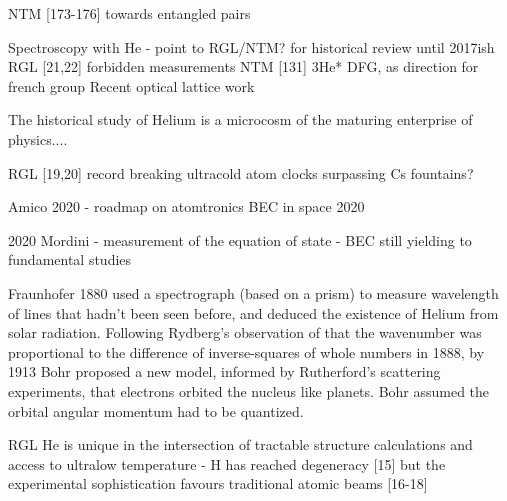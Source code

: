 		NTM [173-176] towards entangled pairs 
			
		Spectroscopy with He - point to RGL/NTM? for historical review until 2017ish
			RGL [21,22] forbidden measurements  
		NTM [131] 3He* DFG, as direction for french group 
		Recent optical lattice work
			
The historical study of Helium is a microcosm of the maturing enterprise of physics....

	RGL [19,20] record breaking ultracold atom clocks surpassing Cs fountains? 


	Amico 2020 - roadmap on atomtronics
	BEC in space 2020

	2020 Mordini - measurement of the equation of state - BEC still yielding to fundamental studies

	\cite{FootAtomic}Fraunhofer 1880 used a spectrograph (based on a prism) to measure wavelength of lines that hadn't been seen before, and deduced the existence of Helium from solar radiation.
Following Rydberg's observation of that the wavenumber was proportional to the difference of inverse-squares of whole numbers in 1888, by 1913 Bohr proposed a new model, informed by Rutherford's scattering experiments, that electrons orbited the nucleus like planets.
	Bohr assumed the orbital angular momentum had to be quantized.

RGL He is unique in the intersection of tractable structure calculations and access to ultralow temperature - H has reached degeneracy [15] but the experimental sophistication favours traditional atomic beams [16-18] 

